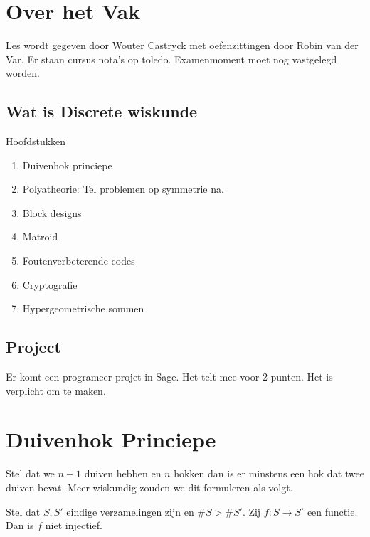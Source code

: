
\setcounter{chapter}{-1}
\chapter{Over het Vak} \label{chap:over_het_vak}
Les wordt gegeven door Wouter Castryck met oefenzittingen door Robin van der Var.
Er staan cursus nota's op toledo. Examenmoment moet nog vastgelegd worden.

\section{Wat is Discrete wiskunde} \label{sec:wat_is_discrete_wiskunde}
Hoofdstukken 
\begin{enumerate}
	\item Duivenhok princiepe
	\item Polyatheorie: Tel problemen op symmetrie na.
	\item Block designs
	\item Matroid 
	\item Foutenverbeterende codes
	\item Cryptografie
	\item Hypergeometrische sommen
\end{enumerate}

\section{Project} \label{sec:project}
Er komt een programeer projet in Sage. Het telt mee voor 2 punten. Het is verplicht om te maken. 

\chapter{Duivenhok Princiepe} \label{chap:duivenhok_princiepe}
Stel dat we $n+1$ duiven hebben en $n$ hokken dan is er minstens een hok dat twee duiven bevat. Meer wiskundig zouden we dit formuleren als volgt.
\begin{stelling}
	Stel dat $S, S'$ eindige verzamelingen zijn en $\#S > \#S'$. Zij  $f: S \to S'$ een functie. Dan is $f$ niet injectief.
\end{stelling}

